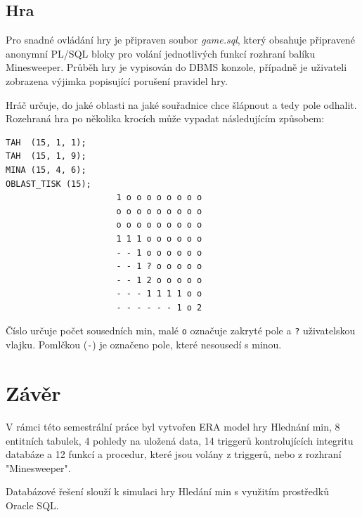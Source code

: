 \documentclass[12pt, a4paper]{article}
\begin{document}
\subsection{Hra}

Pro snadné ovládání hry je připraven soubor \textit{game.sql}, který obsahuje připravené anonymní PL/SQL bloky pro volání jednotlivých funkcí rozhraní balíku Minesweeper. Průběh hry je vypisován do DBMS konzole, případně je uživateli zobrazena výjimka popisující porušení pravidel hry.

Hráč určuje, do jaké oblasti na jaké souřadnice chce šlápnout a tedy pole odhalit. Rozehraná hra po několika krocích může vypadat následujícím způsobem:

\begin{verbatim}
TAH  (15, 1, 1);
TAH  (15, 1, 9);
MINA (15, 4, 6);
OBLAST_TISK (15);
                      1 o o o o o o o o
                      o o o o o o o o o
                      o o o o o o o o o
                      1 1 1 o o o o o o
                      - - 1 o o o o o o
                      - - 1 ? o o o o o
                      - - 1 2 o o o o o
                      - - - 1 1 1 1 o o
                      - - - - - - 1 o 2
\end{verbatim}

Číslo určuje počet sousedních min, malé \texttt{o} označuje zakryté pole a \texttt{?} uživatelskou vlajku. Pomlčkou (\texttt{-}) je označeno pole, které nesousedí s minou.

\section{Závěr}

V rámci této semestrální práce byl vytvořen ERA model hry Hlednání min, 8 entitních tabulek, 4 pohledy na uložená data, 14 triggerů kontrolujících integritu databáze  a 12 funkcí a procedur, které jsou volány z triggerů, nebo z rozhraní "Minesweeper".

Databázové řešení slouží k simulaci hry Hledání min s využitím prostředků Oracle SQL.
\end{document}
